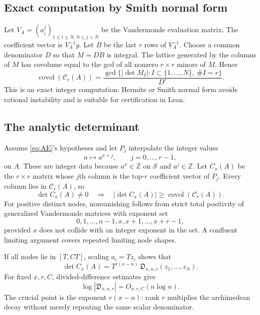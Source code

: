 \documentclass[11pt]{article}
\theoremstyle{definition}
\theoremstyle{remark}
\newcommand{\Z}{\mathbb Z}
\newcommand{\covol}{\operatorname{covol}}
\newcommand{\calS}{\mathcal S}
\newcommand{\calC}{\mathcal C}
\newcommand{\abs}[1]{\left|#1\right|}
\begin{document}
\subsection{Exact computation by Smith normal form}
Let $V_A=(a_i^{j})_{1\le i\le N,\,0\le j<N}$ be the Vandermonde evaluation matrix.  The coefficient vector is $V_A^{-1}y$.  Let $B$ be the last $r$ rows of $V_A^{-1}$.  Choose a common denominator $D$ so that $M=DB$ is integral.  The lattice generated by the columns of $M$ has covolume equal to the gcd of all nonzero $r\times r$ minors of $M$.  Hence
\begin{equation}\label{eq:covol-snf}
   \covol(\calC_r(A))
   =\frac{\gcd\{\abs{\det M_I}: I\subset\{1,\dots,N\},\ \#I=r\}}{D^r}.
\end{equation}
This is an exact integer computation.  Hermite or Smith normal form avoids rational instability and is suitable for certification in Lean.

\subsection{The analytic determinant}
Assume \eqref{eq:AE}'s hypotheses and let $P_j$ interpolate the integer values
\[
       a\longmapsto a^{x+j},\qquad j=0,\dots,r-1,
\]
on $A$.  These are integer data because $a^x\in\Z$ on $\calS$ and $a^j\in\Z$.  Let $C_x(A)$ be the $r\times r$ matrix whose $j$th column is the top-$r$ coefficient vector of $P_j$.  Every column lies in $\calC_r(A)$, so
\begin{equation}\label{eq:lattice-lower}
       \det C_x(A)\ne0
       \quad\Longrightarrow\quad
       \abs{\det C_x(A)}\ge\covol(\calC_r(A)).
\end{equation}
For positive distinct nodes, nonvanishing follows from strict total positivity of generalized Vandermonde matrices with exponent set
\[
       0,1,\dots,n-1,x,x+1,\dots,x+r-1,
\]
provided $x$ does not collide with an integer exponent in the set.  A confluent limiting argument covers repeated limiting node shapes.

If all nodes lie in $[T,CT]$, scaling $a_i=Tz_i$ shows that
\begin{equation}\label{eq:analytic-scale}
       \det C_x(A)
       =T^{r(x-n)}\,\mathfrak D_{x,n,r}(z_1,\dots,z_N).
\end{equation}
For fixed $x,r,C$, divided-difference estimates give
\begin{equation}\label{eq:shape-bound}
       \log\abs{\mathfrak D_{x,n,r}}
       =O_{x,r,C}(n\log n).
\end{equation}
The crucial point is the exponent $r(x-n)$: rank $r$ multiplies the archimedean decay without merely repeating the same scalar denominator.
\end{document}
